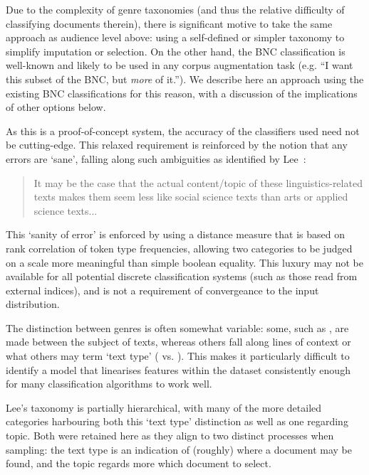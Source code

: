 Due to the complexity of genre taxonomies (and thus the relative difficulty of classifying documents therein), there is significant motive to take the same approach as audience level above: using a self-defined or simpler taxonomy to simplify imputation or selection.  On the other hand, the BNC classification is well-known and likely to be used in any corpus augmentation task (e.g. ``I want this subset of the BNC, but \textsl{more} of it.'').  We describe here an approach using the existing BNC classifications for this reason, with a discussion of the implications of other options below.


As this is a proof-of-concept system, the accuracy of the classifiers used need not be cutting-edge.  This relaxed requirement is reinforced by the notion that any errors are `sane', falling along such ambiguities as identified by Lee~\cite[p.~11]{lee2003bnc}:

\begin{quote}
It may be the case that the actual content/topic of these linguistics-related texts makes them seem less like social science texts than arts or applied science texts...
\end{quote}

This `sanity of error' is enforced by using a distance measure that is based on rank correlation of token type frequencies, allowing two categories to be judged on a scale more meaningful than simple boolean equality.  This luxury may not be available for all potential discrete classification systems (such as those read from external indices), and is not a requirement of convergeance to the input distribution.

The distinction between genres is often somewhat variable: some, such as , are made between the subject of texts, whereas others fall along lines of context or what others may term `text type' ( vs. ).  This makes it particularly difficult to identify a model that linearises features within the dataset consistently enough for many classification algorithms to work well.

Lee's taxonomy is partially hierarchical, with many of the more detailed categories harbouring both this `text type' distinction as well as one regarding topic.  Both were retained here as they align to two distinct processes when sampling: the text type is an indication of (roughly) where a document may be found, and the topic regards more which document to select.





